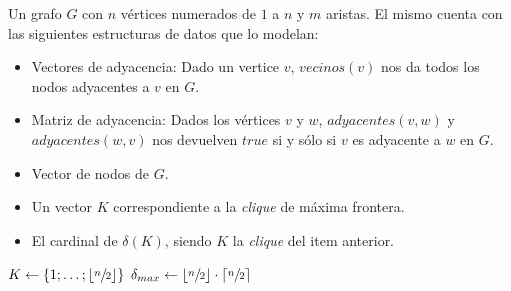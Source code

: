 \begin{pseudocodigo}
    \Require Un grafo $G$ con $n$ v\'ertices numerados de $1$ a $n$ y $m$ aristas. El mismo
        cuenta con las siguientes estructuras de datos que lo modelan:
        \begin{itemize}
            \item Vectores de adyacencia: Dado un vertice $v$, $vecinos(v)$ nos da todos los
                nodos adyacentes a $v$ en $G$.

            \item Matriz de adyacencia: Dados los v\'ertices $v$ y $w$, $adyacentes(v,w)$ y
                $adyacentes(w,v)$ nos devuelven $true$ si y s\'olo si $v$ es adyacente
                a $w$ en $G$.

            \item Vector de nodos de $G$.
        \end{itemize}
    \Ensure\Statex
        \begin{itemize}
            \item Un vector $K$ correspondiente a la \emph{clique} de m\'axima frontera.

            \item El cardinal de $\delta(K)$, siendo $K$ la \emph{clique} del item anterior.
        \end{itemize}

    \Statex
     
        \State $K \gets \left\{1;\dots;\left\lfloor\sfrac{n}{2}\right\rfloor\right\}$ 
        \Statex
        \State $\delta_{max} \gets \left\lfloor\sfrac{n}{2}\right\rfloor\cdot
            \left\lceil\sfrac{n}{2}\right\rceil$ 
        \Statex


\end{pseudocodigo}
